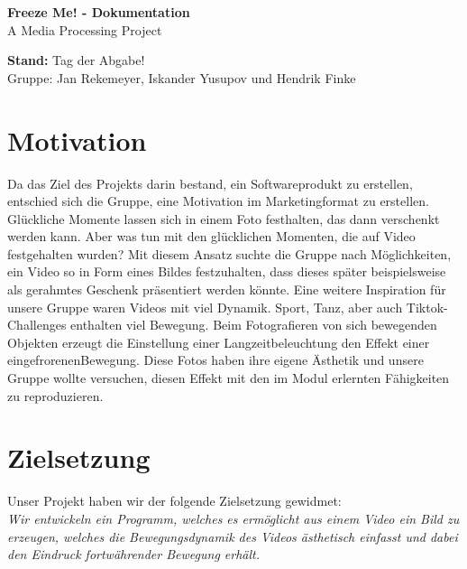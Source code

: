 \documentclass[12pt]{scrartcl}
\begin{document}
\hspace{-0.4cm}\huge \textbf{Freeze Me! - Dokumentation}\vspace{3pt}\\\Large A Media Processing Project \vspace{14pt}\large 

\noindent
\textbf{Stand:} Tag der Abgabe! \\ 

\vspace{3pt} \normalsize Gruppe: 
Jan Rekemeyer, Iskander Yusupov und Hendrik Finke

\section{Motivation}
Da das Ziel des Projekts darin bestand, ein Softwareprodukt zu erstellen, entschied sich die Gruppe, eine Motivation im Marketingformat zu erstellen.\\Gl\"uckliche Momente lassen sich in einem Foto festhalten, das dann verschenkt werden kann. Aber was tun mit den gl\"ucklichen Momenten, die auf Video festgehalten wurden? Mit diesem Ansatz suchte die Gruppe nach M\"oglichkeiten, ein Video so in Form eines Bildes festzuhalten, dass dieses sp\"ater beispielsweise als gerahmtes Geschenk pr\"asentiert werden k\"onnte.
Eine weitere Inspiration f\"ur unsere Gruppe waren Videos mit viel Dynamik. Sport, Tanz, aber auch Tiktok-Challenges enthalten viel Bewegung. Beim Fotografieren von sich bewegenden Objekten erzeugt die Einstellung einer Langzeitbeleuchtung den Effekt einer \glqq eingefrorenen\grqq  Bewegung. Diese Fotos haben ihre eigene \"Asthetik und unsere Gruppe wollte versuchen, diesen Effekt mit den im Modul erlernten F\"ahigkeiten zu reproduzieren.

\section{Zielsetzung}Unser Projekt haben wir der folgende Zielsetzung gewidmet: \\
\textit{Wir entwickeln ein Programm, welches es erm\"oglicht aus einem Video ein Bild zu erzeugen, welches die Bewegungsdynamik des Videos \"asthetisch einfasst und dabei den Eindruck fortw\"ahrender Bewegung erh\"alt.}


\end{document}
